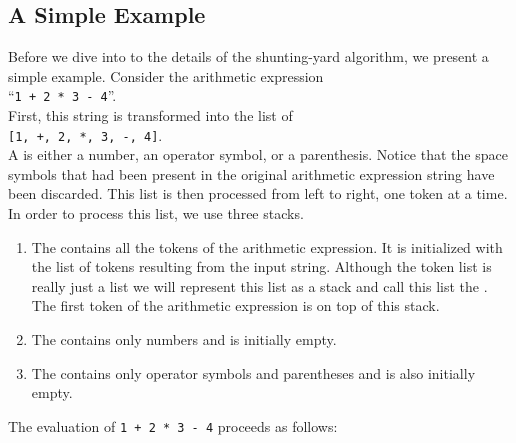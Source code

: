 \subsection{A Simple Example}
Before we dive into to the details of the shunting-yard algorithm, we present a
simple example.  Consider the arithmetic expression 
\\[0.2cm]
\hspace*{1.3cm} 
``\texttt{1 + 2 * 3 - 4}''. 
\\[0.2cm]
First, this string is transformed into the list of 
\\[0.2cm]
\hspace*{1.3cm}
\texttt{[1, +, 2, *, 3, -, 4]}.
\\[0.2cm]
A  is either a number, an operator symbol, or a parenthesis.
Notice that the space symbols that had been present in the original arithmetic expression string
have been discarded.  This list is then processed from left to right, one token
 at a time.  In order to process this list, we use three stacks.
\begin{enumerate}
\item The   contains all the tokens of the arithmetic expression.  It is
      initialized with the list of tokens resulting from the input string.
      Although the token list is really just a list we will represent this list as a stack and call
      this list the .
      The first token of the arithmetic expression is on top of this stack.
\item The   contains only numbers and is initially empty.
\item The  contains only operator symbols and parentheses and is also initially
      empty.
\end{enumerate}
The evaluation of \texttt{1 + 2 * 3 - 4} proceeds as follows:
